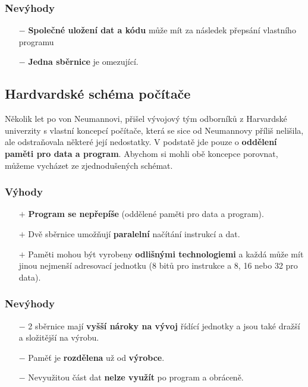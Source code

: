 \subsubsection*{Nevýhody}
\begin{itemize}
	\item[$-$] \textbf{Společné uložení dat a kódu} může mít za následek přepsání vlastního programu
	
	\item[$-$] \textbf{Jedna sběrnice} je omezující.
\end{itemize}

\subsection{Hardvardské schéma počítače}
Několik let po von Neumannovi, přišel vývojový tým odborníků z Harvardské univerzity s vlastní koncepcí počítače, která se sice od Neumannovy příliš nelišila, ale odstraňovala některé její nedostatky. V podstatě jde pouze o \textbf{oddělení paměti pro data a program}. Abychom si mohli obě koncepce porovnat, můžeme vycházet ze zjednodušených schémat.
\newline

\noindent{}

\subsubsection*{Výhody}
\begin{itemize}
	\item[$+$]\textbf{Program se nepřepíše} (oddělené paměti pro data a program).
	\item[$+$]Dvě sběrnice umožňují \textbf{paralelní} načítání instrukcí a dat.
	\item[$+$]Paměti mohou být vyrobeny \textbf{odlišnými technologiemi }a každá může mít jinou nejmenší adresovací jednotku (8 bitů pro instrukce a 8, 16 nebo 32 pro data).
\end{itemize}


\subsubsection*{Nevýhody}
\begin{itemize}
\item[$-$]2 sběrnice mají \textbf{vyšší nároky na vývoj} řídící jednotky a jsou také dražší a složitější na výrobu.
\item[$-$]Paměť je \textbf{rozdělena} už od \textbf{výrobce}.
\item[$-$]Nevyužitou část dat \textbf{nelze využít }po program a obráceně.
\end{itemize}


